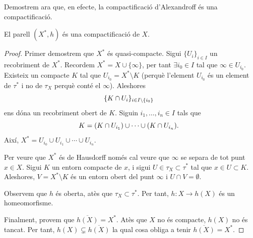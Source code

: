 \documentclass[../main.tex]{subfiles}
\begin{document}
Demostrem ara que, en efecte, la compactificació d'Alexandroff és una compactificació.

\begin{ter}
\label{ter:compactificaciodalexandroff} El parell $(X^*,h)$ és una compactificació de $X$.
\end{ter}
\begin{proof}
Primer demostrem que $X^*$ és quasi-compacte. Sigui $\{U_i\}_{i\in I}$ un recobriment de $X^*$. Recordem $X^* = X\cup\{\infty\}$, per tant $\exists i_0\in I$ tal que $\infty\in U_{i_0}$. Existeix un compacte $K$ tal que $U_{i_0} = X^*\setminus K$ (perquè l'element $U_{i_0}$ és un element de $\tau^*$ i no de $\tau_X$ perquè conté el $\infty$). Aleshores
\begin{equation}
    \notag
    \{K\cap U_i\}_{i\in I\setminus\{i_0\}} 
\end{equation}
ens dóna un recobriment obert de $K$. Siguin $i_1,\ldots,i_n\in I$ tals que
\begin{equation}
    \notag
    K = (K\cap U_{i_1})\cup\cdots\cup(K\cap U_{i_n}).
\end{equation}
Així, $X^* = U_{i_0}\cup U_{i_1}\cup\cdots\cup U_{i_n}$.

Per veure que $X^*$ és de Hausdorff només cal veure que $\infty$ se separa de tot punt $x\in X$. Sigui $K$ un entorn compacte de $x$, i sigui $U\in\tau_X\subset \tau^*$ tal que $x\in U\subset K$. Aleshores, $V = X^*\setminus K$ és un entorn obert del punt $\infty$ i $U\cap V = \emptyset$.

Observem que $h$ és oberta, atès que $\tau_X\subset\tau^*$. Per tant, $h:X\rightarrow h(X)$ és un homeomorfisme.

Finalment, provem que $\overline{h(X)} = X^*$. Atès que $X$ no és compacte, $h(X)$ no és tancat. Per tant, $h(X)\varsubsetneq \overline{h(X)}$ la qual cosa obliga a tenir $\overline{h(X)} = X^*$.
\end{proof}
\end{document}
